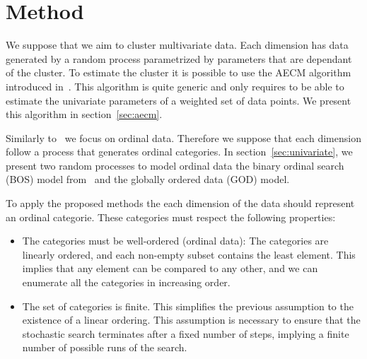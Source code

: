 \section{Method}

We suppose that we aim to cluster multivariate data. Each dimension has data generated by a random process parametrized by parameters that are dependant of the cluster. To estimate the cluster it is possible to use the AECM algorithm introduced in~\citep{meng1997algorithm}. This algorithm is quite generic and only requires to be able to estimate the univariate parameters of a weighted set of data points. We present this algorithm in section~\ref{sec:aecm}.

Similarly to~\cite{biernacki2016model} we focus on ordinal data. Therefore we suppose that each dimension follow a process that generates ordinal categories. 
In section~\ref{sec:univariate}, we present two random processes to model ordinal data the binary ordinal search (BOS) model from~\cite{biernacki2016model} and the globally ordered data (GOD) model.

To apply the proposed methods the each dimension of the data should represent an ordinal categorie. These categories must respect the following properties:

\begin{itemize}
\item The categories must be well-ordered (ordinal data): The categories are linearly ordered, and each non-empty subset contains the least element. This implies that any element can be compared to any other, and we can enumerate all the categories in increasing order.

\item The set of categories is finite. This simplifies the previous assumption to the existence of a linear ordering. This assumption is necessary to ensure that the stochastic search terminates after a fixed number of steps, implying a finite number of possible runs of the search.
\end{itemize}



